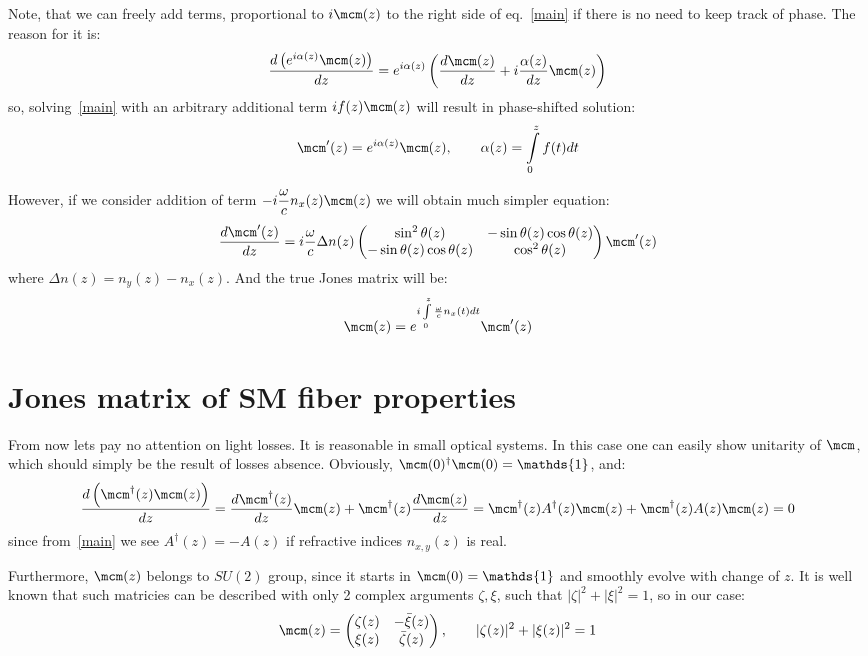 \documentclass[12pt, notitlepage]{report}
\begin{document}
	Note, that we can freely add terms, proportional to $i\mcm(z)$ to the right side of eq.~\eqref{main} if there is no need to keep track of phase. The reason for it is:
	\begin{equation*}
		\dfrac{d\left(e^{i\alpha(z)}\mcm(z)\right)}{dz} = e^{i\alpha(z)}\left(\dfrac{d\mcm(z)}{dz} + i\dfrac{\alpha(z)}{dz}\mcm(z)\right)
	\end{equation*}
	so, solving~\eqref{main} with an arbitrary additional term $if(z)\mcm(z)$ will result in phase-shifted solution:
	\begin{equation*}
		\mcm'(z) = e^{i\alpha(z)}\mcm(z), \qquad \alpha(z) = \int\limits_0^zf(t)dt
	\end{equation*}

	However, if we consider addition of term $-i \dfrac{\omega}{c} n_x(z) \mcm(z)$ we will obtain much simpler equation:
	\begin{equation}
		\label{main2}
		\dfrac{d\mcm'(z)}{dz} = i\dfrac{\omega}{c}\Delta n(z)\begin{pmatrix}
			\sin^2\theta(z) & -\sin\theta(z)\cos\theta(z) \\
			-\sin\theta(z)\cos\theta(z) & \cos^2\theta(z)
		\end{pmatrix}\mcm'(z)
	\end{equation}
	where $\Delta n(z) = n_y(z) - n_x(z)$. And the true Jones matrix will be:
	\begin{equation}
		\label{true}
		\mcm(z) = e^{i\int\limits_0^z \frac{\omega}{c} n_x(t) dt}\mcm'(z)
	\end{equation}

\section{Jones matrix of SM fiber properties}
From now lets pay no attention on light losses. It is reasonable in small optical systems. In this case one can easily show unitarity of $\mcm$, which should simply be the result of losses absence. Obviously, $\mcm(0)^\dagger\mcm(0) = \mathds{1}$, and:
\begin{equation*}
	\dfrac{d\left(\mcm^\dagger(z)\mcm(z)\right)}{dz} = \dfrac{d\mcm^\dagger(z)}{dz}\mcm(z) + \mcm^\dagger(z)\dfrac{d\mcm(z)}{dz} = \mcm^\dagger(z) A^\dagger(z) \mcm(z) + \mcm^\dagger(z)A(z)\mcm(z) = 0
\end{equation*}
since from~\eqref{main} we see $A^\dagger(z)=-A(z)$ if refractive indices $n_{x,y}(z)$ is real. 

Furthermore, $\mcm(z)$ belongs to $SU(2)$ group, since it starts in $\mcm(0)=\mathds{1}$ and smoothly evolve with change of $z$. It is well known that such matricies can be described with only 2 complex arguments $\zeta, \xi$, such that $|\zeta|^2+|\xi|^2=1$, so in our case:
\begin{equation*}
	\mcm(z) = \begin{pmatrix}
		\zeta(z) & -\bar{\xi}(z) \\
		\xi(z) &  \bar{\zeta}(z)
	\end{pmatrix}, \qquad |\zeta(z)|^2+|\xi(z)|^2=1
\end{equation*}
\end{document}
